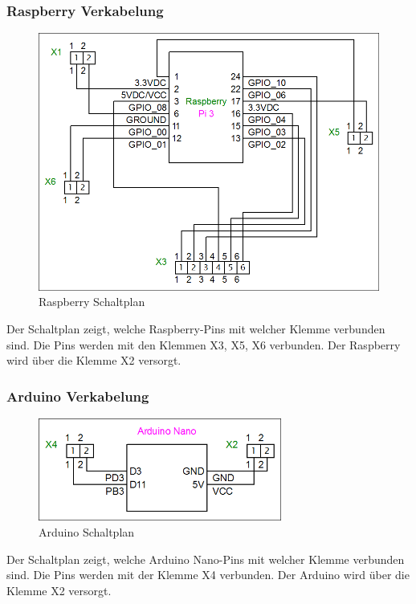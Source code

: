 \subsubsection{Raspberry Verkabelung}
\begin{figure}[H] 
\begin{center}

\includegraphics[width=12cm]{Bilder/Schaltplan/Raspberry_Verkabelung}
\caption{Raspberry Schaltplan}
\label{Rasp_Circuit}

\end{center}
\end{figure}
Der Schaltplan zeigt, welche Raspberry-Pins mit welcher Klemme verbunden sind.
Die Pins werden mit den Klemmen X3, X5, X6 verbunden.
Der Raspberry wird über die Klemme X2 versorgt.

\subsubsection{Arduino Verkabelung}
\begin{figure}[H] 
\begin{center}

\includegraphics[width=8cm]{Bilder/Schaltplan/Arduino_Verkabelung}
\caption{Arduino Schaltplan}
\label{Ard_Circuit}

\end{center}
\end{figure}
Der Schaltplan zeigt, welche Arduino Nano-Pins mit welcher Klemme verbunden sind.
Die Pins werden mit der Klemme X4 verbunden.
Der Arduino wird über die Klemme X2 versorgt.

